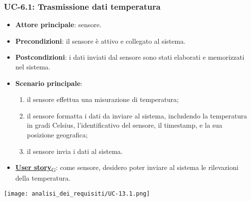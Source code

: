 \subsubsection{UC-6.1: Trasmissione dati temperatura}
\begin{itemize}
	\item \textbf{Attore principale}: sensore.
	\item \textbf{Precondizioni}: il sensore è attivo e collegato al sistema.
	\item \textbf{Postcondizioni}: i dati inviati dal sensore sono stati elaborati e memorizzati nel sistema.
	\item \textbf{Scenario principale}:
	      \begin{enumerate}
		      \item il sensore effettua una misurazione di temperatura;
		      \item il sensore formatta i dati da inviare al sistema, includendo la temperatura in gradi Celsius, l'identificativo del sensore,
		            il timestamp, e la sua posizione geografica;
		      \item il sensore invia i dati al sistema.
	      \end{enumerate}
	\item \href{https://7last.github.io/docs/pb/documentazione-interna/glossario\#user-story}{\textbf{User story}\textsubscript{G}}: come sensore, desidero poter inviare al sistema le rilevazioni della temperatura.
\end{itemize}

\begin{center}
	\texttt{[image: analisi\_dei\_requisiti/UC-13.1.png]}
\end{center}

